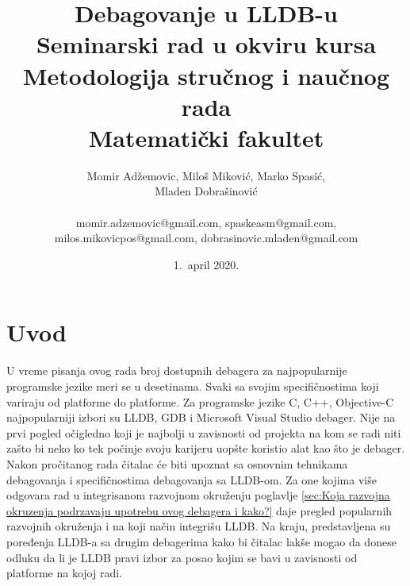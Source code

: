 \documentclass[a4paper]{article}
\begin{document}
\title{Debagovanje u LLDB-u\\ \small{Seminarski rad u okviru kursa\\Metodologija stručnog i naučnog rada\\ Matematički fakultet}}

\author{Momir Adžemovic, Miloš Miković, Marko Spasić,\\ Mladen Dobrašinović\\ \\ \small momir.adzemovic@gmail.com, spaskeasm@gmail.com,\\ \small milos.mikovicpos@gmail.com, dobrasinovic.mladen@gmail.com}

\date{1.~april 2020.}

\maketitle


\tableofcontents

\newpage

\section{Uvod}
\label{sec:uvod}

U vreme pisanja ovog rada broj dostupnih debagera za najpopularnije programske jezike meri se u desetinama. Svaki sa svojim specifičnostima koji variraju od platforme do platforme. Za programske jezike C, C++, Objective-C najpopularniji izbori su LLDB, GDB i Microsoft Visual Studio debager. Nije na prvi pogled očigledno koji je najbolji u zavisnosti od projekta na kom se radi niti zašto bi neko ko tek počinje svoju karijeru uopšte koristio alat kao što je debager.
Nakon pročitanog rada čitalac će biti upoznat sa osnovnim tehnikama debagovanja i specifičnostima debagovanja sa LLDB-om. Za one kojima više odgovara rad u integrisanom razvojnom okruženju poglavlje \ref{sec:Koja razvojna okruzenja podrzavaju upotrebu ovog debagera i kako?} daje pregled popularnih razvojnih okruženja i na koji način integrišu LLDB. Na kraju, predstavljena su poređenja LLDB-a sa drugim debagerima kako bi čitalac lakše mogao da donese odluku da li je LLDB pravi izbor za posao kojim se bavi u zavisnosti od platforme na kojoj radi. 
\end{document}
